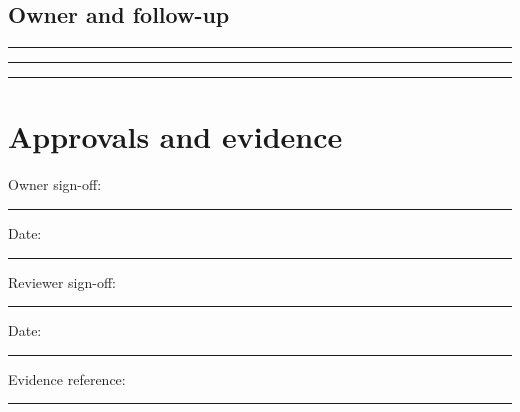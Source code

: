 \documentclass[11pt]{article}
\begin{document}
\subsection{Owner and follow-up}
\noindent\rule{\linewidth}{0.3pt}\par\vspace{0.18in}
\noindent\rule{\linewidth}{0.3pt}\par\vspace{0.18in}
\noindent\rule{\linewidth}{0.3pt}\par\vspace{0.14in}

\section{Approvals and evidence}
\noindent Owner sign-off: \rule{0.42\linewidth}{0.4pt}\hfill Date: \rule{0.19\linewidth}{0.4pt}\par\vspace{0.4cm}
\noindent Reviewer sign-off: \rule{0.40\linewidth}{0.4pt}\hfill Date: \rule{0.19\linewidth}{0.4pt}\par\vspace{0.4cm}
\noindent Evidence reference: \rule{0.70\linewidth}{0.4pt}
\end{document}
